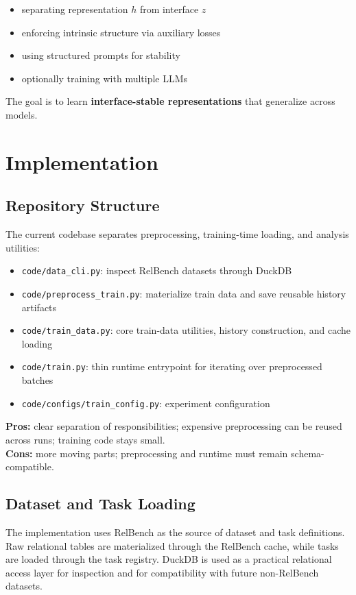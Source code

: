 \documentclass[11pt]{article}
\begin{document}
\begin{itemize}
\item separating representation $h$ from interface $z$
\item enforcing intrinsic structure via auxiliary losses
\item using structured prompts for stability
\item optionally training with multiple LLMs
\end{itemize}

The goal is to learn \textbf{interface-stable representations} that generalize across models.

\section{Implementation}

\subsection{Repository Structure}

The current codebase separates preprocessing, training-time loading, and analysis utilities:
\begin{itemize}
\item \texttt{code/data\_cli.py}: inspect RelBench datasets through DuckDB
\item \texttt{code/preprocess\_train.py}: materialize train data and save reusable history artifacts
\item \texttt{code/train\_data.py}: core train-data utilities, history construction, and cache loading
\item \texttt{code/train.py}: thin runtime entrypoint for iterating over preprocessed batches
\item \texttt{code/configs/train\_config.py}: experiment configuration
\end{itemize}

\textbf{Pros:} clear separation of responsibilities; expensive preprocessing can be reused across runs; training code stays small.\\
\textbf{Cons:} more moving parts; preprocessing and runtime must remain schema-compatible.

\subsection{Dataset and Task Loading}

The implementation uses RelBench as the source of dataset and task definitions. Raw relational tables are materialized through the RelBench cache, while tasks are loaded through the task registry. DuckDB is used as a practical relational access layer for inspection and for compatibility with future non-RelBench datasets.
\end{document}
